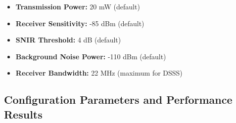 \documentclass{article}
\begin{document}
\begin{itemize}

  \item \textbf{Transmission Power:} 20 mW (default)

  \item \textbf{Receiver Sensitivity:} -85 dBm (default)

  \item \textbf{SNIR Threshold:} 4 dB (default)

  \item \textbf{Background Noise Power:} -110 dBm (default)

  \item \textbf{Receiver Bandwidth:} 22 MHz (maximum for DSSS)

\end{itemize}

\subsection{Configuration Parameters and Performance Results}
\end{document}
